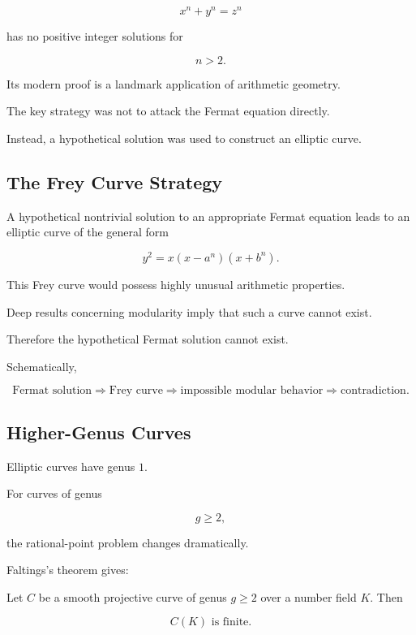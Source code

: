 \[ x^n+y^n=z^n \]

has no positive integer solutions for

\[ n>2. \]

Its modern proof is a landmark application of arithmetic geometry.

The key strategy was not to attack the Fermat equation directly.

Instead, a hypothetical solution was used to construct an elliptic curve.

\subsection{The Frey Curve Strategy}
\label{subsec:frey-curve-strategy-arithmetic}

A hypothetical nontrivial solution to an appropriate Fermat equation leads
to an elliptic curve of the general form

\[ y^2=x(x-a^n)(x+b^n). \]

This Frey curve would possess highly unusual arithmetic properties.

Deep results concerning modularity imply that such a curve cannot exist.

Therefore the hypothetical Fermat solution cannot exist.

Schematically,

\[
\boxed{
\text{Fermat solution}
\Longrightarrow
\text{Frey curve}
\Longrightarrow
\text{impossible modular behavior}
\Longrightarrow
\text{contradiction}.
}
\]

\subsection{Higher-Genus Curves}
\label{subsec:higher-genus-arithmetic-geometry}

Elliptic curves have genus \(1\).

For curves of genus

\[ g\geq2, \]

the rational-point problem changes dramatically.

Faltings's theorem gives:

\begin{theorem}[Faltings]
Let \(C\) be a smooth projective curve of genus \(g\geq2\) over a number
field \(K\). Then

\[ \boxed{C(K)\text{ is finite}.} \]
\end{theorem}


